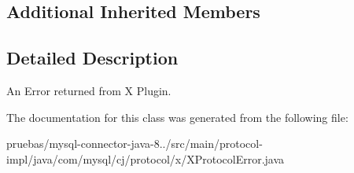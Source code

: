 \subsection*{Additional Inherited Members}


\subsection{Detailed Description}
An Error returned from X Plugin. 

The documentation for this class was generated from the following file\+:\begin{DoxyCompactItemize}
\item 
pruebas/mysql-\/connector-\/java-\/8../src/main/protocol-\/impl/java/com/mysql/cj/protocol/x/X\+Protocol\+Error.\+java\end{DoxyCompactItemize}
